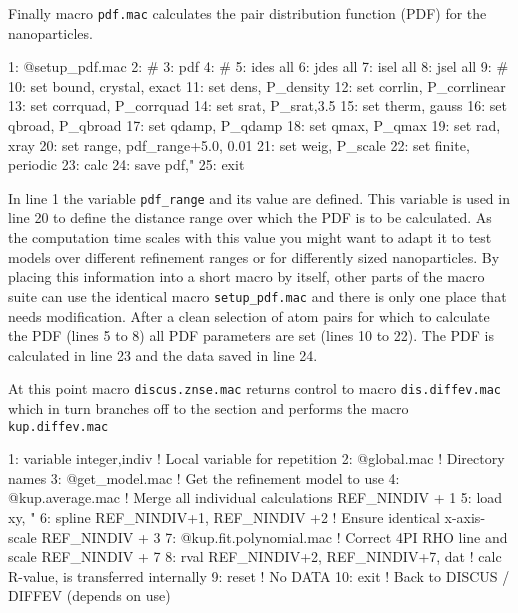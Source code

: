 Finally macro {\tt pdf.mac} calculates the pair distribution function (PDF)
for the nanoparticles. 
\begin{MacVerbatim}
 1: @setup_pdf.mac
 2: #
 3: pdf
 4: #
 5:     ides all
 6:     jdes all
 7:     isel all
 8:     jsel all
 9: #
10:     set bound,    crystal, exact
11:     set dens,     P_density
12:     set corrlin,  P_corrlinear
13:     set corrquad, P_corrquad
14:     set srat,     P_srat,3.5
15:     set therm,    gauss
16:     set qbroad,   P_qbroad
17:     set qdamp,    P_qdamp
18:     set qmax,     P_qmax
19:     set rad,      xray
20:     set range,    pdf_range+5.0, 0.01
21:     set weig,     P_scale
22:     set finite,   periodic
23:     calc
24:     save pdf,"%
25: exit
\end{MacVerbatim}

In line 1 the variable {\tt pdf\_range} and its value are defined. This 
variable is used in line 20 to define the distance range over which the 
PDF is to be calculated. As the computation time scales with this value
you might want to adapt it to test models over different refinement 
ranges or for differently sized nanoparticles. By placing this information
into a short macro by itself, other parts of the macro suite can use the 
identical macro {\tt setup\_pdf.mac} and there is only one place that needs
modification. After a clean selection of atom pairs for which to calculate
the PDF (lines 5 to 8) all PDF parameters are set (lines 10 to 22). 
The PDF is calculated in line 23 and the data saved in line 24.


At this point macro {\tt discus.znse.mac} returns control to macro
{\tt dis.diffev.mac} which in turn branches off to the \Kuplot
section and performs the macro {\tt kup.diffev.mac}

\begin{MacVerbatim}
 1: variable integer,indiv       ! Local variable for repetition
 2: @global.mac                  ! Directory names 
 3: @get_model.mac               ! Get the refinement model to use
 4: @kup.average.mac             ! Merge all individual calculations REF_NINDIV + 1
 5: load xy, "%
 6: spline REF_NINDIV+1, REF_NINDIV +2   ! Ensure identical x-axis-scale REF_NINDIV + 3
 7: @kup.fit.polynomial.mac      ! Correct 4PI RHO line and scale    REF_NINDIV + 7
 8: rval REF_NINDIV+2, REF_NINDIV+7, dat ! calc R-value, is transferred internally
 9: reset                        ! No DATA
10: exit                         ! Back to DISCUS / DIFFEV (depends on use)
\end{MacVerbatim}

